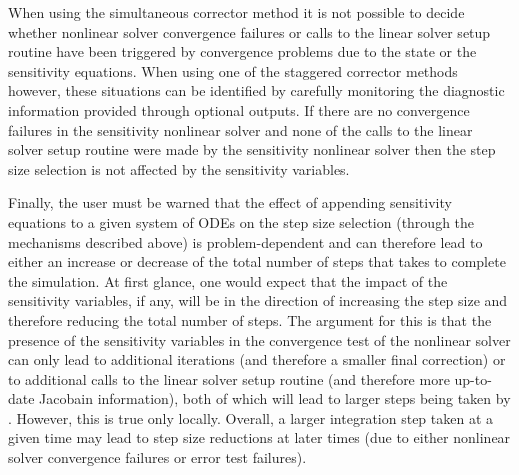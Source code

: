 When using the simultaneous corrector method it is not possible to decide whether 
nonlinear solver convergence failures or calls to the linear solver setup routine
have been triggered by convergence problems due to the state or the sensitivity 
equations.
When using one of the staggered corrector methods however, these situations can be 
identified by carefully monitoring the diagnostic information provided through 
optional outputs. If there are no convergence
failures in the sensitivity nonlinear solver and none
of the calls to the linear solver setup routine were made by the sensitivity
nonlinear solver then the step size selection is
not affected by the sensitivity variables.

Finally, the user must be warned that the effect of appending sensitivity 
equations to a given system of ODEs on the step size selection 
(through the mechanisms described above) is problem-dependent and can therefore
lead to either an increase or decrease of the total number of steps that {\cvodes} takes
to complete the simulation. At first glance, one would expect that the impact
of the sensitivity variables, if any, will be in the direction of increasing the
step size and therefore reducing the total number of steps. The argument for this
is that the presence of the sensitivity variables in the convergence test of the
nonlinear solver can only lead to additional iterations (and therefore a smaller
final correction) or to additional calls to the linear solver setup routine
(and therefore more up-to-date Jacobain information), both of which will lead
to larger steps being taken by {\cvodes}. However, this is true only locally.
Overall, a larger integration step taken at a given time may lead to 
step size reductions at later times (due to either nonlinear solver convergence
failures or error test failures).